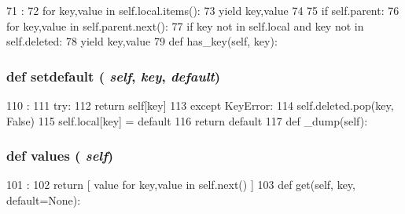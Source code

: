\begin{DoxyCode}
71                   :
72         for key,value in self.local.items():
73             yield key,value
74 
75         if self.parent:
76             for key,value in self.parent.next():
77                 if key not in self.local and key not in self.deleted:
78                     yield key,value
79 
    def has_key(self, key):
\end{DoxyCode}
\hypertarget{classm5_1_1util_1_1multidict_1_1multidict_a1af96fe42a8e8c54a0c606fb4f01df98}{
\subsubsection[{setdefault}]{\setlength{\rightskip}{0pt plus 5cm}def setdefault ( {\em self}, \/   {\em key}, \/   {\em default})}}
\label{classm5_1_1util_1_1multidict_1_1multidict_a1af96fe42a8e8c54a0c606fb4f01df98}



\begin{DoxyCode}
110                                       :
111         try:
112             return self[key]
113         except KeyError:
114             self.deleted.pop(key, False)
115             self.local[key] = default
116             return default
117 
    def _dump(self):
\end{DoxyCode}
\hypertarget{classm5_1_1util_1_1multidict_1_1multidict_abb73a0060caeba53780d972f37623f1e}{
\subsubsection[{values}]{\setlength{\rightskip}{0pt plus 5cm}def values ( {\em self})}}
\label{classm5_1_1util_1_1multidict_1_1multidict_abb73a0060caeba53780d972f37623f1e}



\begin{DoxyCode}
101                     :
102         return [ value for key,value in self.next() ]
103 
    def get(self, key, default=None):
\end{DoxyCode}


